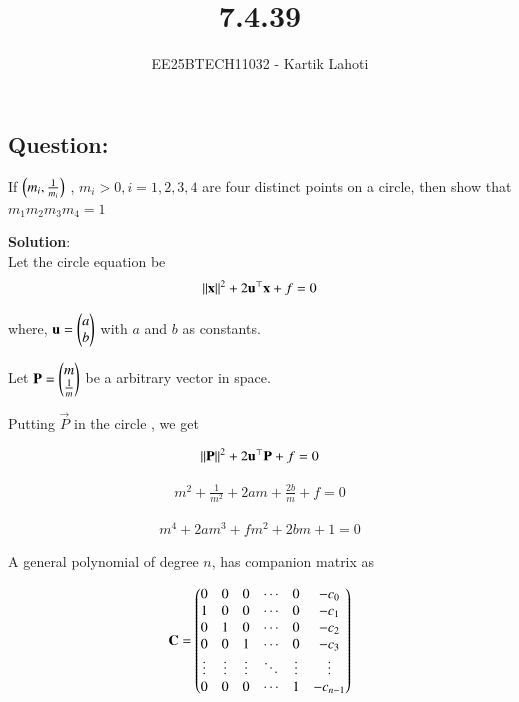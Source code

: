 \documentclass[journal]{IEEEtran}
\numberwithin{equation}{enumi}
\numberwithin{figure}{enumi}
\begin{document}

\vspace{3cm}

\title{7.4.39}
\author{EE25BTECH11032 - Kartik Lahoti}
\maketitle

\subsection*{Question: } 

If $\left(m_i , \frac{1}{m_i}\right)$ , $m_i > 0 , i = 1, 2,3,4$ are four distinct points on a circle, then show that $m_1m_2m_3m_4 = 1 $

\textbf{Solution}:\\


Let the circle equation be 
\begin{align}
    \left\lVert\mathbf{x}\right\rVert^2 + 2\mathbf{u}^{\top}\mathbf{x} + f = 0 
\end{align}

where, $\mathbf{u} = \begin{pmatrix}a \\ b\end{pmatrix}$ with $a$ and $b$ as constants.

Let $\mathbf{P} = \begin{pmatrix}m \\ \frac{1}{m}\end{pmatrix}$ be a arbitrary vector in space.

Putting $\vec{P}$ in the circle , we get 


\begin{align}
    \left\lVert\mathbf{P}\right\rVert^2 + 2\mathbf{u}^{\top}\mathbf{P} + f = 0 
\end{align}

\begin{align}
    m^2 + \frac{1}{m^2} + 2am + \frac{2b}{m} + f = 0
\end{align}

\begin{align}
    m^4 + 2am^3 + fm^2 + 2bm + 1 = 0 \label{eq_1}
\end{align}

A general polynomial of degree $n$, has companion matrix as

\begin{align}
   \mathbf{C} = \begin{pmatrix}0 & 0 & 0 & \cdots & 0 & -c_{0} \\
1 & 0 & 0 & \cdots & 0 & -c_{1} \\
0 & 1 & 0 & \cdots & 0 & -c_{2} \\
0 & 0 & 1 & \cdots & 0 & -c_{3} \\
\vdots & \vdots & \vdots & \ddots & \vdots & \vdots \\
0 & 0 & 0 & \cdots & 1 & -c_{n-1}\end{pmatrix}
\end{align}
\end{document}
